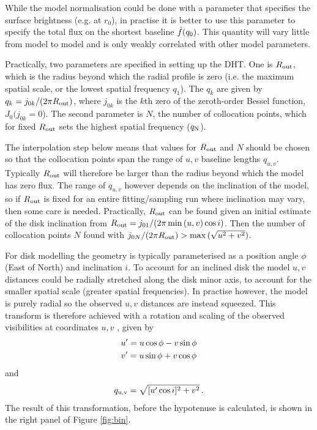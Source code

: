 \documentclass[fleqn,usenatbib]{mnras}
\begin{document}
While the model normalisation could be done with a parameter that specifies the surface brightness (e.g. at $r_0$), in practise it is better to use this parameter to specify the total flux on the shortest baseline $\Tilde{f}(q_0)$. This quantity will vary little from model to model and is only weakly correlated with other model parameters.

Practically, two parameters are specified in setting up the DHT. One is $R_{\rm out}$, which is the radius beyond which the radial profile is zero (i.e. the maximum spatial scale, or the lowest spatial frequency $q_1$). The $q_k$ are given by $q_k = j_{0k}/(2 \pi R_{\rm out})$, where $j_{0k}$ is the $k$th zero of the zeroth-order Bessel function, $J_0(j_{0k}=0$). The second parameter is $N$, the number of collocation points, which for fixed $R_{\rm out}$ sets the highest spatial frequency ($q_{\rm N}$). 

The interpolation step below means that values for $R_{\rm out}$ and $N$ should be chosen so that the collocation points span the range of $u,v$ baseline lengths $q_{u,v}$. Typically $R_{\rm out}$ will therefore be larger than the radius beyond which the model has zero flux. The range of $q_{u,v}$ however depends on the inclination of the model, so if $R_{\rm out}$ is fixed for an entire fitting/sampling run where inclination may vary, then some care is needed. Practically, $R_{\rm out}$ can be found given an initial estimate of the disk inclination from $R_{\rm out} = j_{01}/(2 \pi \min{(u,v)} \cos i)$. Then the number of collocation points $N$ found with $j_{0N}/(2 \pi R_{\rm out}) > \max{(\sqrt{u^2+v^2})}$.

For disk modelling the geometry is typically parameterised as a position angle $\phi$ (East of North) and inclination $i$. To account for an inclined disk the model $u,v$ distances could be radially stretched along the disk minor axis, to account for the smaller spatial scale (greater spatial frequencies). In practise however, the model is purely radial so the observed $u,v$ distances are instead squeezed. This transform is therefore achieved with a rotation and scaling of the observed visibilities at coordinates $u,v$ \citep[e.g. as in][]{2018MNRAS.476.4527T}, given by
\begin{gather}
    u' = u \cos \phi - v \sin \phi \notag \\
    v' = u \sin \phi + v \cos \phi
\end{gather}
and 
\begin{equation}
    q_{\rm u,v} = \sqrt{[u' \cos i]^2 + v^2} \, .
\end{equation}
The result of this transformation, before the hypotenuse is calculated, is shown in the right panel of Figure \ref{fig:bin}.
\end{document}
